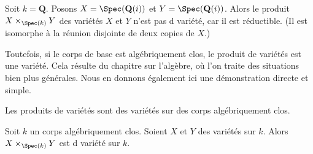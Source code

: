 \begin{example}
\label{example-product-not-a-variety}
Soit $k = \mathbf{Q}$. Posons $X = \Spec(\mathbf{Q}(i))$
et $Y = \Spec(\mathbf{Q}(i))$. Alors le produit
$X \times_{\Spec(k)} Y$ des variétés $X$ et $Y$
n'est pas d variété, car il est réductible. (Il est
isomorphe à la réunion disjointe de deux copies de $X$.)
\end{example}

\noindent
Toutefois, si le corps de base est algébriquement clos, le produit de
variétés est une variété. Cela résulte du chapitre sur l'algèbre, où
l'on traite des situations bien plus générales. Nous en donnons également
ici une démonstration directe et simple.

\begin{lemma}
\label{lemma-product-varieties}
\begin{slogan}
Les produits de variétés sont des variétés sur des corps algébriquement clos.
\end{slogan}
Soit $k$ un corps algébriquement clos.
Soient $X$ et $Y$ des variétés sur $k$.
Alors $X \times_{\Spec(k)} Y$ est d variété sur $k$.
\end{lemma}

